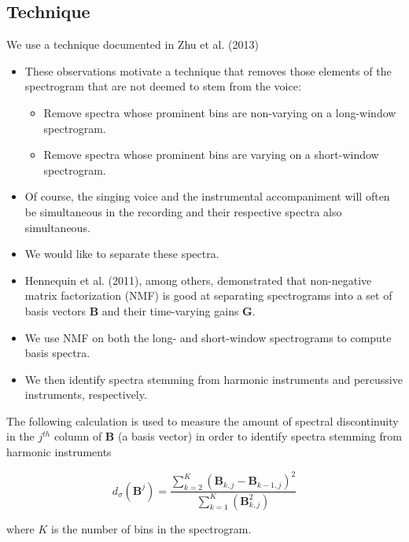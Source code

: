 \documentclass[72pt]{article}
\begin{document}
\begin{Huge}
\section*{Technique}
We use a technique documented in Zhu et al. (2013)
\begin{itemize}
    \item These observations motivate a technique that removes those elements of
the spectrogram that are not deemed to stem from the voice:
    \begin{itemize}
        \item Remove spectra whose prominent bins are non-varying on a
long-window spectrogram.
        \item Remove spectra whose prominent bins are varying on a short-window
spectrogram.
    \end{itemize}
\end{itemize}

\newpage
\begin{itemize}
    \item Of course, the singing voice and the instrumental accompaniment will often be
    simultaneous in the recording and their respective spectra also simultaneous.
    \item We would like to separate these spectra.
    \item Hennequin et al. (2011), among others, demonstrated that non-negative
matrix factorization (NMF) is good at separating spectrograms into a set of basis
vectors \( \mathbf{B} \) and their time-varying gains \( \mathbf{G} \).
    \item We use NMF on both the long- and short-window spectrograms to compute
basis spectra.
    \item We then identify spectra stemming from harmonic instruments and
percussive instruments, respectively.
\end{itemize}

\newpage

The following calculation is used to measure the amount of spectral
discontinuity in the \( j^{th} \) column of \( \mathbf{B} \) (a basis vector) in
order to identify spectra stemming from harmonic instruments

\begin{equation} \label{eq:discontinuityfreq}
d_\sigma(\mathbf{B}^j) =
\frac{\sum\limits_{k=2}^{K}(\mathbf{B}_{k,j}-\mathbf{B}_{k-1,j})^2}{
    \sum\limits_{k=1}^{K}(\mathbf{B}_{k,j}^{2})}
\end{equation}

where \( K \) is the number of bins in the spectrogram.


\end{Huge}
\end{document}
